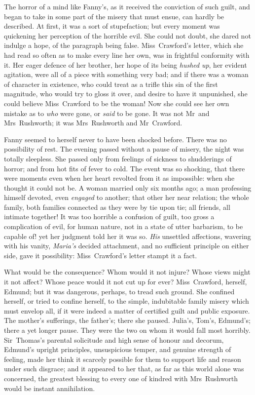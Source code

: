 The horror of a mind like Fanny's, as it received the conviction of such guilt, and began to take in some part of the misery that must ensue, can hardly be described. At first, it was a sort of stupefaction; but every moment was quickening her perception of the horrible evil. She could not doubt, she dared not indulge a hope, of the paragraph being false. Miss~Crawford's letter, which she had read so often as to make every line her own, was in frightful conformity with it. Her eager defence of her brother, her hope of its being \textit{hushed}  \textit{up}, her evident agitation, were all of a piece with something very bad; and if there was a woman of character in existence, who could treat as a trifle this sin of the first magnitude, who would try to gloss it over, and desire to have it unpunished, she could believe Miss~Crawford to be the woman! Now she could see her own mistake as to \textit{who}  were gone, or \textit{said}  to be gone. It was not Mr~and Mrs~Rushworth; it was Mrs~Rushworth and Mr~Crawford.

Fanny seemed to herself never to have been shocked before. There was no possibility of rest. The evening passed without a pause of misery, the night was totally sleepless. She passed only from feelings of sickness to shudderings of horror; and from hot fits of fever to cold. The event was so shocking, that there were moments even when her heart revolted from it as impossible: when she thought it could not be. A woman married only six months ago; a man professing himself devoted, even \textit{engaged}  to another; that other her near relation; the whole family, both families connected as they were by tie upon tie; all friends, all intimate together! It was too horrible a confusion of guilt, too gross a complication of evil, for human nature, not in a state of utter barbarism, to be capable of! yet her judgment told her it was so. \textit{His}  unsettled affections, wavering with his vanity, \textit{Maria's}  decided attachment, and no sufficient principle on either side, gave it possibility: Miss~Crawford's letter stampt it a fact.

What would be the consequence? Whom would it not injure? Whose views might it not affect? Whose peace would it not cut up for ever? Miss~Crawford, herself, Edmund; but it was dangerous, perhaps, to tread such ground. She confined herself, or tried to confine herself, to the simple, indubitable family misery which must envelop all, if it were indeed a matter of certified guilt and public exposure. The mother's sufferings, the father's; there she paused. Julia's, Tom's, Edmund's; there a yet longer pause. They were the two on whom it would fall most horribly. Sir~Thomas's parental solicitude and high sense of honour and decorum, Edmund's upright principles, unsuspicious temper, and genuine strength of feeling, made her think it scarcely possible for them to support life and reason under such disgrace; and it appeared to her that, as far as this world alone was concerned, the greatest blessing to every one of kindred with Mrs~Rushworth would be instant annihilation.

